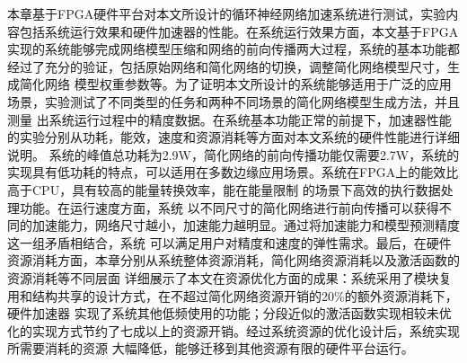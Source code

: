 本章基于FPGA硬件平台对本文所设计的循环神经网络加速系统进行测试，实验内容包括系统运行效果和硬件加速器的性能。在系统运行效果方面，本文基于FPGA
实现的系统能够完成网络模型压缩和网络的前向传播两大过程，系统的基本功能都经过了充分的验证，包括原始网络和简化网络的切换，调整简化网络模型尺寸，生成简化网络
模型权重参数等。为了证明本文所设计的系统能够适用于广泛的应用场景，实验测试了不同类型的任务和两种不同场景的简化网络模型生成方法，并且测量
出系统运行过程中的精度数据。在系统基本功能正常的前提下，加速器性能的实验分别从功耗，能效，速度和资源消耗等方面对本文系统的硬件性能进行详细说明。
系统的峰值总功耗为2.9W，简化网络的前向传播功能仅需要2.7W，系统的实现具有低功耗的特点，可以适用在多数边缘应用场景。系统在FPGA上的能效比高于CPU，具有较高的能量转换效率，能在能量限制
的场景下高效的执行数据处理功能。在运行速度方面，系统
以不同尺寸的简化网络进行前向传播可以获得不同的加速能力，网络尺寸越小，加速能力越明显。通过将加速能力和模型预测精度这一组矛盾相结合，系统
可以满足用户对精度和速度的弹性需求。最后，在硬件资源消耗方面，本章分别从系统整体资源消耗，简化网络资源消耗以及激活函数的资源消耗等不同层面
详细展示了本文在资源优化方面的成果：系统采用了模块复用和结构共享的设计方式，在不超过简化网络资源开销的20\%的额外资源消耗下，硬件加速器
实现了系统其他低频使用的功能；分段近似的激活函数实现相较未优化的实现方式节约了七成以上的资源开销。经过系统资源的优化设计后，系统实现所需要消耗的资源
大幅降低，能够迁移到其他资源有限的硬件平台运行。







%
